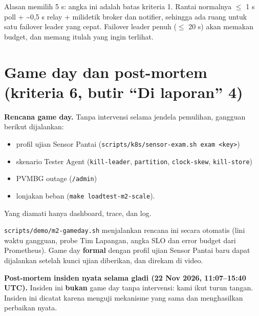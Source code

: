 Alasan memilih 5 s: angka ini adalah batas kriteria 1. Rantai normalnya $\le$ 1 s poll + \textasciitilde{}0,5 s relay + milidetik broker dan notifier, sehingga ada ruang untuk satu failover leader yang cepat. Failover leader penuh ($\le$ 20 s) akan memakan budget, dan memang itulah yang ingin terlihat.


\section{Game day dan post-mortem (kriteria 6, butir ``Di laporan'' 4)}

\textbf{Rencana game day.} Tanpa intervensi selama jendela pemulihan, gangguan berikut dijalankan:


\begin{itemize}
\item profil ujian Sensor Pantai (\texttt{scripts/\allowbreak{}k8s/\allowbreak{}sensor-\allowbreak{}exam.\allowbreak{}sh exam <key>})
\item skenario Tester Agent (\texttt{kill-\allowbreak{}leader}, \texttt{partition}, \texttt{clock-\allowbreak{}skew}, \texttt{kill-\allowbreak{}store})
\item PVMBG outage (\texttt{/\allowbreak{}admin})
\item lonjakan beban (\texttt{make loadtest-\allowbreak{}m2-\allowbreak{}scale}).
\end{itemize}

Yang diamati hanya dashboard, trace, dan log.


\texttt{scripts/\allowbreak{}demo/\allowbreak{}m2-\allowbreak{}gameday.\allowbreak{}sh} menjalankan rencana ini secara otomatis (lini waktu gangguan, probe Tim Lapangan, angka SLO dan error budget dari Prometheus). Game day \textbf{formal} dengan profil ujian Sensor Pantai baru dapat dijalankan setelah kunci ujian diberikan, dan direkam di video.


\textbf{Post-mortem insiden nyata selama gladi (22 Nov 2026, 11:07--15:40 UTC).} Insiden ini \textbf{bukan} game day tanpa intervensi: kami ikut turun tangan. Insiden ini dicatat karena menguji mekanisme yang sama dan menghasilkan perbaikan nyata.


